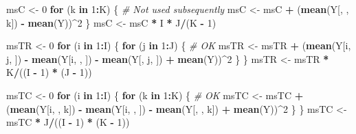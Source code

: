 \documentclass[
]{book}
\newenvironment{Shaded}{\begin{snugshade}}{\end{snugshade}}
\newcommand{\CommentTok}[1]{\textcolor[rgb]{0.56,0.35,0.01}{\textit{#1}}}
\newcommand{\ControlFlowTok}[1]{\textcolor[rgb]{0.13,0.29,0.53}{\textbf{#1}}}
\newcommand{\DecValTok}[1]{\textcolor[rgb]{0.00,0.00,0.81}{#1}}
\newcommand{\KeywordTok}[1]{\textcolor[rgb]{0.13,0.29,0.53}{\textbf{#1}}}
\newcommand{\NormalTok}[1]{#1}
\newcommand{\OperatorTok}[1]{\textcolor[rgb]{0.81,0.36,0.00}{\textbf{#1}}}
\newcommand{\StringTok}[1]{\textcolor[rgb]{0.31,0.60,0.02}{#1}}
\begin{document}
\begin{Shaded}
\begin{Highlighting}[]
\NormalTok{msC \textless{}{-}}\StringTok{ }\DecValTok{0}
\ControlFlowTok{for}\NormalTok{ (k }\ControlFlowTok{in} \DecValTok{1}\OperatorTok{:}\NormalTok{K) \{ }\CommentTok{\# Not used subsequently}
\NormalTok{  msC \textless{}{-}}\StringTok{ }\NormalTok{msC }\OperatorTok{+}\StringTok{ }\NormalTok{(}\KeywordTok{mean}\NormalTok{(Y[, , k]) }\OperatorTok{{-}}\StringTok{ }\KeywordTok{mean}\NormalTok{(Y))}\OperatorTok{\^{}}\DecValTok{2}
\NormalTok{\}}
\NormalTok{msC \textless{}{-}}\StringTok{ }\NormalTok{msC }\OperatorTok{*}\StringTok{ }\NormalTok{I }\OperatorTok{*}\StringTok{ }\NormalTok{J}\OperatorTok{/}\NormalTok{(K }\OperatorTok{{-}}\StringTok{ }\DecValTok{1}\NormalTok{)}

\NormalTok{msTR \textless{}{-}}\StringTok{ }\DecValTok{0}
\ControlFlowTok{for}\NormalTok{ (i }\ControlFlowTok{in} \DecValTok{1}\OperatorTok{:}\NormalTok{I) \{}
  \ControlFlowTok{for}\NormalTok{ (j }\ControlFlowTok{in} \DecValTok{1}\OperatorTok{:}\NormalTok{J) \{ }\CommentTok{\# OK}
\NormalTok{    msTR \textless{}{-}}\StringTok{ }\NormalTok{msTR }\OperatorTok{+}\StringTok{ }\NormalTok{(}\KeywordTok{mean}\NormalTok{(Y[i, j, ]) }\OperatorTok{{-}}\StringTok{ }\KeywordTok{mean}\NormalTok{(Y[i, , ]) }\OperatorTok{{-}}\StringTok{ }\KeywordTok{mean}\NormalTok{(Y[, j, ]) }\OperatorTok{+}\StringTok{ }\KeywordTok{mean}\NormalTok{(Y))}\OperatorTok{\^{}}\DecValTok{2}
\NormalTok{  \}}
\NormalTok{\}}
\NormalTok{msTR \textless{}{-}}\StringTok{ }\NormalTok{msTR }\OperatorTok{*}\StringTok{ }\NormalTok{K}\OperatorTok{/}\NormalTok{((I }\OperatorTok{{-}}\StringTok{ }\DecValTok{1}\NormalTok{) }\OperatorTok{*}\StringTok{ }\NormalTok{(J }\OperatorTok{{-}}\StringTok{ }\DecValTok{1}\NormalTok{))}

\NormalTok{msTC \textless{}{-}}\StringTok{ }\DecValTok{0}
\ControlFlowTok{for}\NormalTok{ (i }\ControlFlowTok{in} \DecValTok{1}\OperatorTok{:}\NormalTok{I) \{}
  \ControlFlowTok{for}\NormalTok{ (k }\ControlFlowTok{in} \DecValTok{1}\OperatorTok{:}\NormalTok{K) \{ }\CommentTok{\# OK}
\NormalTok{    msTC \textless{}{-}}\StringTok{ }\NormalTok{msTC }\OperatorTok{+}\StringTok{ }\NormalTok{(}\KeywordTok{mean}\NormalTok{(Y[i, , k]) }\OperatorTok{{-}}\StringTok{ }\KeywordTok{mean}\NormalTok{(Y[i, , ]) }\OperatorTok{{-}}\StringTok{ }\KeywordTok{mean}\NormalTok{(Y[, , k]) }\OperatorTok{+}\StringTok{ }\KeywordTok{mean}\NormalTok{(Y))}\OperatorTok{\^{}}\DecValTok{2}
\NormalTok{  \}}
\NormalTok{\}}
\NormalTok{msTC \textless{}{-}}\StringTok{ }\NormalTok{msTC }\OperatorTok{*}\StringTok{ }\NormalTok{J}\OperatorTok{/}\NormalTok{((I }\OperatorTok{{-}}\StringTok{ }\DecValTok{1}\NormalTok{) }\OperatorTok{*}\StringTok{ }\NormalTok{(K }\OperatorTok{{-}}\StringTok{ }\DecValTok{1}\NormalTok{))}


\end{Highlighting}
\end{Shaded}
\end{document}

